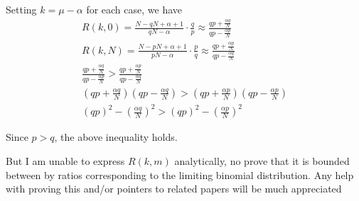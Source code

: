 \documentclass[11pt,draft]{article}
\begin{document}
Setting  $k=\mu - \alpha$ for each case, we have
\begin{align}
R(k,0) =  \frac{N-qN + \alpha+1}{qN-\alpha} \cdot \frac{q}{p} \approx \frac{qp + \frac{\alpha q}{N}}{qp - \frac{\alpha p}{N}}\\
R(k,N) = \frac{N-pN + \alpha+1}{pN-\alpha} \cdot \frac{p}{q} \approx \frac{qp + \frac{\alpha p}{N}}{qp - \frac{\alpha q}{N}}\\
\frac{qp + \frac{\alpha q}{N}}{qp - \frac{\alpha p}{N}} >  \frac{qp + \frac{\alpha p}{N}}{qp - \frac{\alpha q}{N}} \\
(qp + \frac{\alpha q}{N})(qp - \frac{\alpha q}{N}) > (qp + \frac{\alpha p}{N})(qp - \frac{\alpha p}{N}) \\
(qp)^2 - \left ( \frac{\alpha q}{N} \right )^2 > (qp)^2 - \left ( \frac{\alpha p}{N} \right )^2 
\end{align}

Since $p>q$, the above inequality holds.

But I am unable to express $R(k,m)$ analytically, no prove that it is bounded between by ratios corresponding to the limiting binomial distribution.
Any help with proving this and/or pointers to related papers will be much appreciated 
\end{document}

